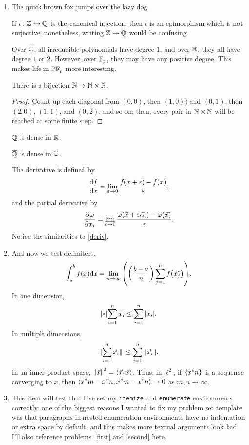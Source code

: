 \documentclass[onesided]{../ccg-pset}
\author{Colton Grainger}
\date{\today}
\begin{document}
\maketitle

\begin{enumerate}
\item %
\label{first}
The quick brown fox jumps over the lazy dog.
\begin{thm}
If \(\iota:\mathbb Z\hookrightarrow\mathbb Q\) is the canonical injection, then \(\iota\) is an epimorphism which is not surjective;
nonetheless, writing \(\mathbb Z\twoheadrightarrow\mathbb Q\) would be confusing.
\end{thm}
Over \(\mathbb C\), all irreducible polynomials have degree \(1\), and over \(\mathbb R\), they all have degree \(1\) or \(2\).
However, over \(\mathbb F_p\), they may have any positive degree. This makes life in \(\mathbb P\mathbb F_p\) more interesting.
\begin{lem}
There is a bijection \(\mathbb N\to\mathbb N\times\mathbb N\).
\end{lem}
\begin{proof}
Count up each diagonal from \((0,0)\), then \((1,0))\) and \((0,1)\), then \((2,0)\), \((1,1)\), and \((0,2)\), and
so on; then, every pair in \(\mathbb N\times\mathbb N\) will be reached at some finite step.
\end{proof}
\begin{claim}
\(\mathbb Q\) is dense in \(\mathbb R\).
\end{claim}
\begin{claim*}
\(\overline{\mathbb Q}\) is dense in \(\mathbb C\).
\end{claim*}
The derivative is defined by
\begin{equation}
\label{deriv}
	\dv{f}{x} = \lim_{\varepsilon\to 0} \frac{f(x+\varepsilon) - f(x)}{\varepsilon},
\end{equation}
and the partial derivative by
\begin{equation}
	\pdv{\varphi}{x_i} = \lim_{\varepsilon\to 0} \frac{\varphi(\vec x+\varepsilon \vec\alpha_i) - \varphi(\vec x)}{\varepsilon}.
\end{equation}
Notice the similarities to \eqref{deriv}.
\item And now we test delimiters. \label{second}
\[\int_a^b f(x)\dd x = \lim_{n\to\infty}\qty( \qty( \frac{b-a}{n} )\sum_{j=1}^n f\qty( x_j^* ) ).\]
In one dimension,
\begin{equation}
\qty| * |{\sum_{i=1}^n x_i} \le \sum_{i=1}^n \qty| x_i |.
\end{equation}
In multiple dimensions,
\begin{equation}
\norm*{\sum_{i=1}^n \vec x_i} \le \sum_{i=1}^n\norm{\vec x_i}.
\end{equation}
In an inner product space, \(\norm{\vec x}^2 = \left\langle \vec x,\vec x \right\rangle\). Thus, in \(\ell^2\), if \(\qty{ x"n }\) is a
sequence converging to \(x\), then \(\left\langle x"m-x"n,x"m-x"n \right\rangle\to 0\) as \(m,n\to\infty\).
\item This item will test that I've set my \verb+itemize+ and \verb+enumerate+ environments correctly: one of the
biggest reasons I wanted to fix my problem set template was that paragraphs in nested enumeration environments
have no indentation or extra space by default, and this makes more textual arguments look bad. I'll also reference
problems~\ref{first} and \ref{second} here.


\end{enumerate}
\end{document}
